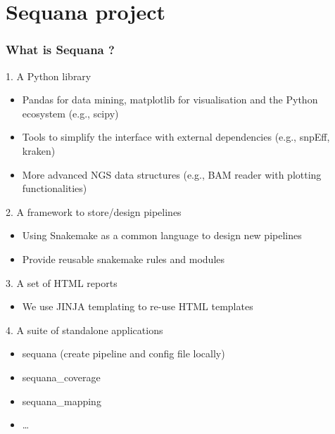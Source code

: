 \documentclass{beamer}
\begin{document}
\section{Sequana project}

\begin{frame}
    \frametitle{What is Sequana ?}
    \begin{block}{1. A Python library}
       \tiny
    \begin{itemize}
        \item Pandas for data mining, matplotlib for visualisation and the Python ecosystem (e.g., scipy)
        \item Tools to simplify the interface with external dependencies (e.g., snpEff, kraken)
        \item More advanced NGS data structures (e.g., BAM reader with plotting functionalities)
    \end{itemize} 
    \end{block}
    \pause
    
    \begin{exampleblock}{2. A framework to store/design pipelines}
    \tiny
    \begin{itemize}
        \item Using Snakemake as a common language to design new pipelines
        \item Provide reusable snakemake rules and modules
    \end{itemize} 
     \end{exampleblock}
  \pause
  
    \begin{block}{3. A set of HTML reports}
    \tiny
    \begin{itemize}
	\item We use JINJA templating to re-use HTML templates
    \end{itemize} 
    \end{block}
  \pause  
    \begin{block}{4. A suite of standalone applications}
    \tiny
    \begin{itemize}
	\item sequana (create pipeline and config file locally)
	\item sequana\_coverage
	\item sequana\_mapping
	\item \dots
    \end{itemize} 
    \end{block}
\end{frame}
\end{document}
